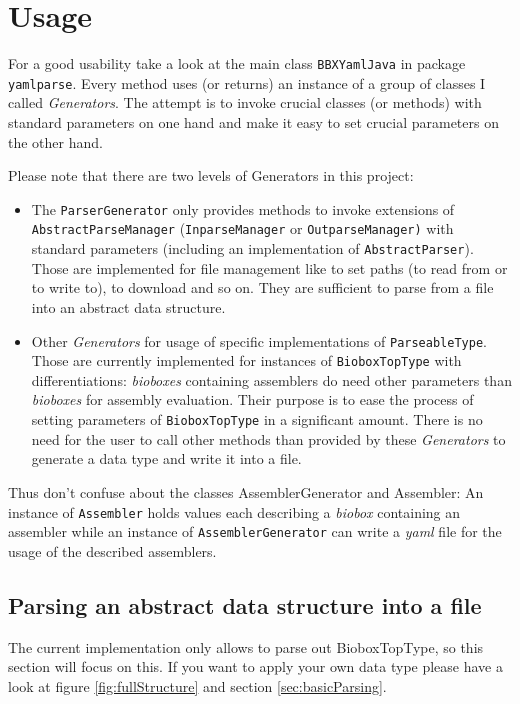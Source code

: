 \documentclass[
	twoside,
	fontsize=12pt,
	headsepline,
	cleardoublepage=empty,
	numbers=noenddot,
	bibliography=totoc,
]{scrbook}
\newcommand{\code}[1]{\texttt{#1}}
\begin{document}
\chapter{Usage}
\label{chap:usage}

For a good usability take a look at the main class \code{BBXYamlJava} in package \code{yamlparse}. Every method uses (or returns) an instance of a group of classes I called \emph{Generators}. The attempt is to invoke crucial classes (or methods) with standard parameters on one hand and make it easy to set crucial parameters on the other hand. 

Please note that there are two levels of Generators in this project:
\begin{itemize}
	\item The \code{ParserGenerator} only provides methods to invoke extensions of \\ \code{AbstractParseManager} (\code{InparseManager} or \code{OutparseManager)} with standard parameters (including an implementation of \code{AbstractParser}). Those are implemented for file management like to set paths (to read from or to write to), to download and so on. They are sufficient to parse from a file into an abstract data structure. 
	\item Other \emph{Generators} for usage of specific implementations of \code{ParseableType}. Those are currently implemented for instances of \code{BioboxTopType} with differentiations: \emph{bioboxes} containing assemblers do need other parameters than \emph{bioboxes} for assembly evaluation. Their purpose is to ease the process of setting parameters of \code{BioboxTopType} in a significant amount. There is no need for the user to call other methods than provided by these \emph{Generators} to generate a data type and write it into a file. 
\end{itemize}

Thus don't confuse about the classes AssemblerGenerator and Assembler:
An instance of \code{Assembler} holds values each describing a \emph{biobox} containing an assembler while an instance of \code{AssemblerGenerator} can write a \emph{yaml} file for the usage of the described assemblers. 

\section{Parsing an abstract data structure into a file}
\label{sec:outparse}
The current implementation only allows to parse out BioboxTopType, so this section will focus on this. If you want to apply your own data type please have a look at figure \ref{fig:fullStructure} and section \ref{sec:basicParsing}. 
\end{document}
